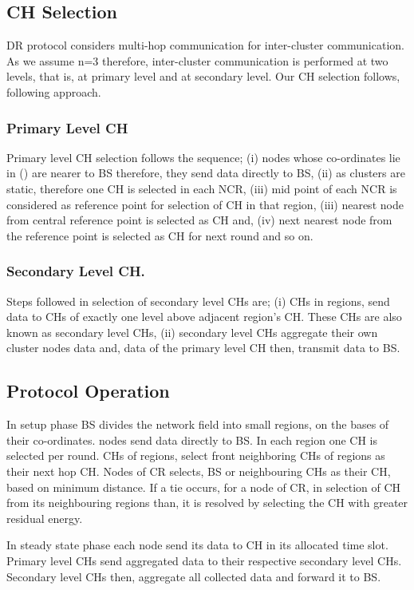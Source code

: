 \documentclass[3p,times,procedia]{elsarticle}
\begin{document}
\subsection{CH Selection}
DR protocol considers multi-hop communication for inter-cluster communication. As we assume n=3 therefore, inter-cluster communication is performed at two levels, that is, at primary level and at secondary level. Our CH selection follows, following approach.

\subsubsection{Primary Level CH}
Primary level CH selection follows the sequence; (i) nodes whose co-ordinates lie in () are nearer to BS therefore, they send data directly to BS, (ii) as clusters are static, therefore one CH is selected in each NCR, (iii) mid point of each NCR is considered as reference point for selection of CH in that region, (iii) nearest node from central reference point is selected as CH and, (iv) next nearest node from the reference point is selected as CH for next round and so on.

\subsubsection{Secondary Level CH.}
Steps followed in selection of secondary level CHs are; (i) CHs in  regions, send data to CHs of exactly one level above adjacent region's CH. These CHs are also known as secondary level CHs, (ii) secondary level CHs aggregate their own cluster nodes data and, data of the primary level CH then, transmit data to BS.
\subsection{Protocol Operation}

In setup phase BS divides the network field into small regions, on the bases of their co-ordinates.  nodes send data directly to BS. In each region one CH is selected per round. CHs of  regions, select front neighboring CHs of  regions as their next hop CH. Nodes of CR selects, BS or neighbouring CHs as their CH, based on minimum distance. If a tie occurs, for a node of CR, in selection of CH from its neighbouring regions than, it is resolved by selecting the CH with greater residual energy.

In steady state phase each node send its data to CH in its allocated time slot. Primary level CHs send aggregated data to their respective secondary level CHs. Secondary level CHs then, aggregate all collected data and forward it to BS.
\end{document}
